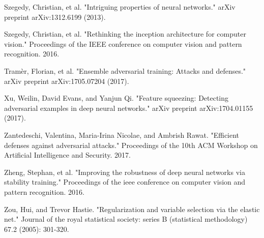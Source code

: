 \begin{thebibliography}{9}
	\bibitem{}
	Szegedy, Christian, et al. "Intriguing properties of neural networks." arXiv preprint arXiv:1312.6199 (2013).
	
	\bibitem{}
	Szegedy, Christian, et al. "Rethinking the inception architecture for computer vision." Proceedings of the IEEE conference on computer vision and pattern recognition. 2016.
	
	\bibitem{}
	Tramèr, Florian, et al. "Ensemble adversarial training: Attacks and defenses." arXiv preprint arXiv:1705.07204 (2017).
	
	\bibitem{}
	Xu, Weilin, David Evans, and Yanjun Qi. "Feature squeezing: Detecting adversarial examples in deep neural networks." arXiv preprint arXiv:1704.01155 (2017).
	
	\bibitem{}
	Zantedeschi, Valentina, Maria-Irina Nicolae, and Ambrish Rawat. "Efficient defenses against adversarial attacks." Proceedings of the 10th ACM Workshop on Artificial Intelligence and Security. 2017.
	
	\bibitem{}
	Zheng, Stephan, et al. "Improving the robustness of deep neural networks via stability training." Proceedings of the ieee conference on computer vision and pattern recognition. 2016.
	
	\bibitem{}
	Zou, Hui, and Trevor Hastie. "Regularization and variable selection via the elastic net." Journal of the royal statistical society: series B (statistical methodology) 67.2 (2005): 301-320.
\end{thebibliography}